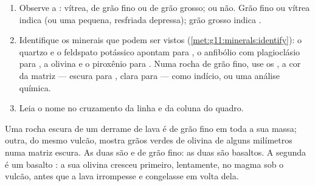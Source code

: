 
\begin{method}\label{met:g11:igneous-rocks:naming}
\begin{enumerate}
  \item Observe a : vítrea, de grão fino ou de grão grosso;
         ou não. Grão fino ou vítrea indica  (ou uma
         pequena, resfriada depressa); grão grosso indica .
  \item Identifique os minerais que podem ser vistos
        (\cref{met:g11:minerals:identify}): o quartzo e o feldspato potássico
        apontam para , o anfibólio com plagioclásio para ,
        a olivina e o piroxênio para . Numa rocha de grão fino, use os
        , a cor da matriz --- escura para , clara para
         --- como indício, ou uma análise química.
  \item Leia o nome no cruzamento da linha e da coluna do quadro.
\end{enumerate}
\end{method}

\begin{example}
Uma rocha escura de um derrame de lava é de grão fino em toda a sua massa;
outra, do mesmo vulcão, mostra grãos verdes de olivina de alguns milímetros
numa matriz escura. As duas são  e de grão fino: as duas são
basaltos. A segunda é um basalto : a sua olivina cresceu primeiro,
lentamente, no magma sob o vulcão, antes que a lava irrompesse e congelasse
em volta dela.
\end{example}

